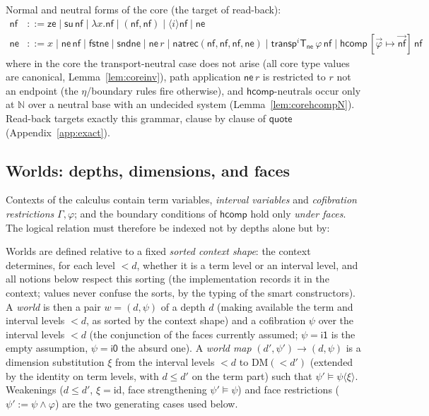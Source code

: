 \documentclass{lmcs}
\newcommand{\DM}[1]{\mathrm{DM}(#1)}
\newcommand{\transp}{\mathsf{transp}}
\newcommand{\hcomp}{\mathsf{hcomp}}
\providecommand{\fst}{}\renewcommand{\fst}{\mathsf{fst}}
\providecommand{\snd}{}\renewcommand{\snd}{\mathsf{snd}}
\newcommand{\ii}{\mathsf{i1}}
\newcommand{\io}{\mathsf{i0}}
\newcommand{\quo}{\mathsf{quote}}
\begin{document}
\noindent Normal and neutral forms of the core (the target of
read-back):
\begin{align*}
  \mathsf{nf} &::= \mathsf{ze} \mid \mathsf{su}\,\mathsf{nf}
    \mid \lambda x.\mathsf{nf} \mid (\mathsf{nf}, \mathsf{nf})
    \mid \langle i \rangle \mathsf{nf} \mid \mathsf{ne} \\
  \mathsf{ne} &::= x \mid \mathsf{ne}\,\mathsf{nf}
    \mid \fst \mathsf{ne} \mid \snd \mathsf{ne}
    \mid \mathsf{ne}\,r
    \mid \mathsf{natrec}(\mathsf{nf}, \mathsf{nf}, \mathsf{nf},
      \mathsf{ne})
    \mid \transp^i \mathsf{T}_{\mathsf{ne}}\,\varphi\,\mathsf{nf}
    \mid \hcomp\,[\vec\varphi \mapsto \vec{\mathsf{nf}}]\,
      \mathsf{nf}
\end{align*}
where in the core the transport-neutral case does not arise (all
core type values are canonical, Lemma~\ref{lem:coreinv}), path
application $\mathsf{ne}\,r$ is restricted to $r$ not an endpoint
(the $\eta$/boundary rules fire otherwise), and $\hcomp$-neutrals
occur only at $\mathbb{N}$ over a neutral base with an undecided
system (Lemma~\ref{lem:corehcompN}).  Read-back targets exactly
this grammar, clause by clause of $\quo$
(Appendix~\ref{app:exact}).

\subsection{Worlds: depths, dimensions, and faces}
\label{app:coreworlds}

Contexts of the calculus contain term variables, \emph{interval
variables} and \emph{cofibration restrictions} $\Gamma, \varphi$;
and the boundary conditions of $\hcomp$ hold only \emph{under
faces}.  The logical relation must therefore be indexed not by
depths alone but by:

\begin{defi}[Worlds]\label{def:worlds}
  Worlds are defined relative to a fixed \emph{sorted context
  shape}: the context determines, for each level $< d$, whether it
  is a term level or an interval level, and all notions below
  respect this sorting (the implementation records it in the
  context; values never confuse the sorts, by the typing of the
  smart constructors).  A \emph{world} is then a pair
  $w = (d, \psi)$ of a depth $d$ (making available the term and
  interval levels $< d$, as sorted by the context shape) and a
  cofibration $\psi$ over the interval levels $< d$ (the conjunction of the
  faces currently assumed; $\psi = \ii$ is the empty assumption,
  $\psi = \io$ the absurd one).  A \emph{world map}
  $(d', \psi') \to (d, \psi)$ is a dimension substitution
  $\xi$ from the interval levels $< d$ to $\DM{<d'}$ (extended by
  the identity on term levels, with $d \le d'$ on the term part)
  such that $\psi' \models \psi\langle\xi\rangle$.  Weakenings
  ($d \le d'$, $\xi = \mathrm{id}$, face strengthening
  $\psi' \models \psi$) and face restrictions
  ($\psi' := \psi \wedge \varphi$) are the two generating cases
  used below.
\end{defi}
\end{document}
